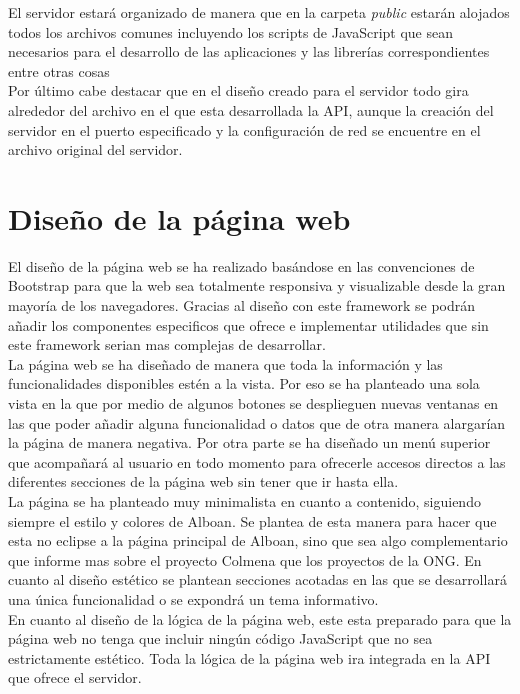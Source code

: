El servidor estará organizado de manera que en la carpeta \textit{public} estarán alojados todos los archivos comunes incluyendo los scripts de JavaScript que sean necesarios para el desarrollo de las aplicaciones y las librerías correspondientes entre otras cosas\\

Por último cabe destacar que en el diseño creado para el servidor todo gira alrededor del archivo en el que esta desarrollada la API, aunque la creación del servidor en el puerto especificado y la configuración de red se encuentre en el archivo original del servidor.\\


\section{Diseño de la página web}
El diseño de la página web se ha realizado basándose en las convenciones de Bootstrap para que la web sea totalmente responsiva y visualizable desde la gran mayoría de los navegadores. Gracias al diseño con este framework se podrán añadir los componentes especificos que ofrece e implementar utilidades que sin este framework serian mas complejas de desarrollar.\\

La página web se ha diseñado de manera que toda la información y las funcionalidades disponibles estén a la vista. Por eso se ha planteado una sola vista en la que por medio de algunos botones se desplieguen nuevas ventanas en las que poder añadir alguna funcionalidad o datos que de otra manera alargarían la página de manera negativa. Por otra parte se ha diseñado un menú superior que acompañará al usuario en todo momento para ofrecerle accesos directos a las diferentes secciones de la página web sin tener que ir hasta ella.\\

La página se ha planteado muy minimalista en cuanto a contenido, siguiendo siempre el estilo y colores de Alboan. Se plantea de esta manera para hacer que esta no eclipse a la página principal de Alboan, sino que sea algo complementario que informe mas sobre el proyecto Colmena que los proyectos de la ONG. En cuanto al diseño estético se plantean secciones acotadas en las que se desarrollará una única funcionalidad o se expondrá un tema informativo.\\

En cuanto al diseño de la lógica de la página web, este esta preparado para que la página web no tenga que incluir ningún código JavaScript que no sea estrictamente estético. Toda la lógica de la página web ira integrada en la API que ofrece el servidor.\\


